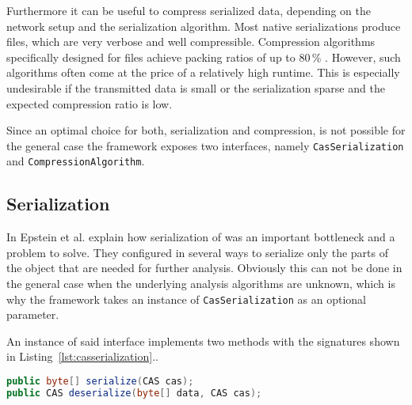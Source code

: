 Furthermore it can be useful to compress serialized data, depending on the network setup and the serialization algorithm. Most native \uima{} serializations produce \xml{} files, which are very verbose and well compressible. Compression algorithms specifically designed for \xml{} files achieve packing ratios of up to 80\,\% \cite{girardot2005system,min2003xpress,sakr2009xml}. However, such algorithms often come at the price of a relatively high runtime. This is especially undesirable if the transmitted data is small or the serialization sparse and the expected compression ratio is low.

Since an optimal choice for both, serialization and compression, is not possible for the general case the framework exposes two interfaces, namely \lstinline|CasSerialization| and \lstinline|CompressionAlgorithm|.
\subsection{Serialization}
In \cite{epstein2012making} Epstein et al. explain how serialization of \cas{} was an important bottleneck and a problem to solve. They configured \uimaas{} in several ways to serialize only the parts of the \cas{} object that are needed for further analysis. Obviously this can not be done in the general case when the underlying analysis algorithms are unknown, which is why the framework takes an instance of \lstinline|CasSerialization| as an optional parameter.

An instance of said interface implements two methods with the signatures shown in Listing~\ref{lst:casserialization}..
\begin{lstlisting}[language=Java,caption={CasSerialization method signatures},label=lst:casserialization]
public byte[] serialize(CAS cas);
public CAS deserialize(byte[] data, CAS cas);
\end{lstlisting}

